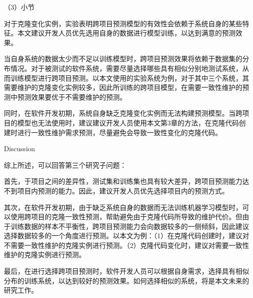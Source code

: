 （3）小节

对于克隆变化实例，实验表明跨项目预测模型的有效性会依赖于系统自身的某些特征。本文建议开发人员优先选用自身的数据进行模型训练，以达到满意的预测效果。

当自身系统的数据太少而不足以训练模型时，跨项目预测效果将依赖于数据集的分布情况。对于被测试的软件系统，需要尽量选择哪些具有相似分别地测试系统，从而训练模型进行跨项目预测。以本文使用的实验系统为例，对于其中三个系统，其需要维护的克隆变化实例较多，因此所训练的跨项目模型，在需要一致性维护的预测中预测效果要优于不需要维护的预测。

同时，在软件开发初期，系统自身缺乏克隆变化实例而无法构建预测模型。当跨项目的模型也无法使用时，建议建议开发人员使用本文第3章的方法，在克隆代码创建时进行一致性维护需求预测，尽量避免会导致一致性变化的克隆代码。

{Discussion}

综上所述，可以回答第三个研究子问题：

首先，于项目之间的差异性，测试集和训练集也具有较大差异，跨项目预测能力达不到项目内预测的能力。因此，建议开发人员优先选择项目内的预测方式。

其次，在软件开发初期，由于缺乏系统自身的数据而无法训练机器学习模型时，可以使用跨项目的克隆一致性预测，帮助避免由于克隆代码所导致的维护代价。但由于训练数据的样本不平衡性，跨项目预测能力会向数据较多的一侧倾斜，因此建议选择数据较多的一个角度进行预测。以本文为例：（1）在克隆代码创建时，建议对不需要一致性维护的克隆实例进行预测。（2）克隆代码变化时，建议对需要一致性维护的克隆实例进行预测。

最后，在进行选择跨项目预测时，软件开发人员可以根据自身需求，选择具有相似分布的训练系统，以达到较好的预测效果。如何选择相似的系统，将是本文未来的研究工作。




